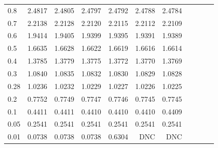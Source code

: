 \begin{landscape}
\begin{table}
\begin{center}
\begin{tabular}{l|rrrrrrrrrr}
0.8 & 2.4817 & 2.4805 & 2.4797 & 2.4792 & 2.4788 & 2.4784  \\ 
0.7 & 2.2138 & 2.2128 & 2.2120 & 2.2115 & 2.2112 & 2.2109  \\ 
0.6 & 1.9414 & 1.9405 & 1.9399 & 1.9395 & 1.9391 & 1.9389  \\ 
0.5 & 1.6635 & 1.6628 & 1.6622 & 1.6619 & 1.6616 & 1.6614  \\ 
0.4 & 1.3785 & 1.3779 & 1.3775 & 1.3772 & 1.3770 & 1.3769  \\ 
0.3 & 1.0840 & 1.0835 & 1.0832 & 1.0830 & 1.0829 & 1.0828  \\ 
0.28 & 1.0236 & 1.0232 & 1.0229 & 1.0227 & 1.0226 & 1.0225  \\ 
0.2 & 0.7752 & 0.7749 & 0.7747 & 0.7746 & 0.7745 & 0.7745  \\ 
0.1 & 0.4411 & 0.4411 & 0.4410 & 0.4410 & 0.4410 & 0.4409  \\ 
0.05 & 0.2541 & 0.2541 & 0.2541 & 0.2541 & 0.2541 & 0.2541  \\ 
0.01 & 0.0738 & 0.0738 & 0.0738 & 0.6304 & DNC & DNC  \\
\hline \hline
\end{tabular}
\end{center}
\end{table}
\end{landscape}


